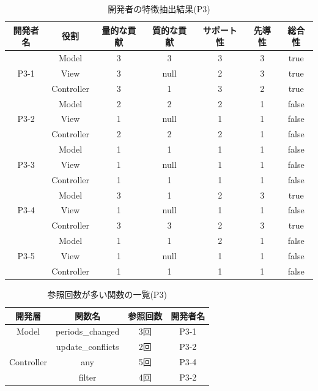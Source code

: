 \documentclass{funthesis}
\begin{document}
\begin{table}[H]
  \begin{center}
\begin{tabular}{|c|c|c|c|c|c|c|}
\hline
開発者名 & 役割 & 量的な貢献 & 質的な貢献 & サポート性 & 先導性 & 総合性\\ \hline

& Model & 3 & 3 & 3 & 3 & true\\ \cline{2-7}
P3-1 & View & 3 & null & 2 & 3 & true\\ \cline{2-7}
& Controller & 3 & 1 & 3 & 2 & true \\ \hline \hline

& Model & 2 & 2 & 2 & 1 & false\\ \cline{2-7}
P3-2 & View & 1 & null & 1 & 1 & false\\ \cline{2-7}
& Controller & 2 & 2 & 2 & 1 & false \\ \hline \hline

& Model & 1 & 1 & 1 & 1 & false\\ \cline{2-7}
P3-3 & View & 1 & null & 1 & 1 & false\\ \cline{2-7}
& Controller & 1 & 1 & 1 & 1 & false \\ \hline \hline

& Model & 3 & 1 & 2 & 3 & true\\ \cline{2-7}
P3-4 & View & 1 & null& 1 & 1 & false\\ \cline{2-7}
& Controller & 3 & 3 & 2 & 3 & true \\ \hline \hline

& Model & 1 & 1 & 2 & 1 & false\\ \cline{2-7}
P3-5 & View & 1 & null & 1 & 1 & false\\ \cline{2-7}
& Controller & 1 & 1 & 1 & 1 & false \\ \hline
\end{tabular}
  \end{center}
  \caption{開発者の特徴抽出結果(P3)}    \label{sample}
\end{table}
\begin{table}[H]
  \begin{center}
\begin{tabular}{|c|c|c|c|}\hline
開発層&関数名&参照回数&開発者名\\ \hline
Model& periods\_changed & 3回 & P3-1 \\ \cline{2-4}
& update\_conflicts & 2回 & P3-2 \\ \cline{2-4}\hline\hline

Controller& any & 5回 & P3-4 \\ \cline{2-4}
& filter & 4回 & P3-2 \\ \cline{2-4}\hline
\end{tabular}    
\caption{参照回数が多い関数の一覧(P3)}    \label{sample}
  \end{center}
\end{table}
\end{document}
